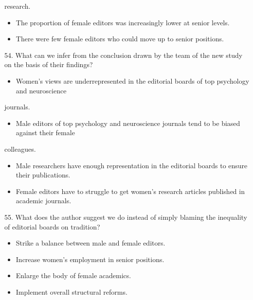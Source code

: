 \documentclass[UTF8,11pt]{ctexart}
\begin{document}
research.


\begin{itemize}[leftmargin=2em,itemsep=.2em,topsep=.4em]\item[C.] The proportion of female editors was increasingly lower at senior levels.
\item[D.] There were few female editors who could move up to senior positions.
\end{itemize}

54. What can we infer from the conclusion drawn by the team of the new study on the basis of their findings?


\begin{itemize}[leftmargin=2em,itemsep=.2em,topsep=.4em]\item[A.] Women’s views are underrepresented in the editorial boards of top psychology and neuroscience
\end{itemize}

journals.


\begin{itemize}[leftmargin=2em,itemsep=.2em,topsep=.4em]\item[B.] Male editors of top psychology and neuroscience journals tend to be biased against their female
\end{itemize}

colleagues.


\begin{itemize}[leftmargin=2em,itemsep=.2em,topsep=.4em]\item[C.] Male researchers have enough representation in the editorial boards to ensure their publications.
\item[D.] Female editors have to struggle to get women’s research articles published in academic journals.
\end{itemize}

55. What does the author suggest we do instead of simply blaming the inequality of editorial boards on tradition?


\begin{itemize}[leftmargin=2em,itemsep=.2em,topsep=.4em]\item[A.] Strike a balance between male and female editors.
\item[B.] Increase women’s employment in senior positions.
\item[C.] Enlarge the body of female academics.
\item[D.] Implement overall structural reforms.
\end{itemize}
\end{document}

